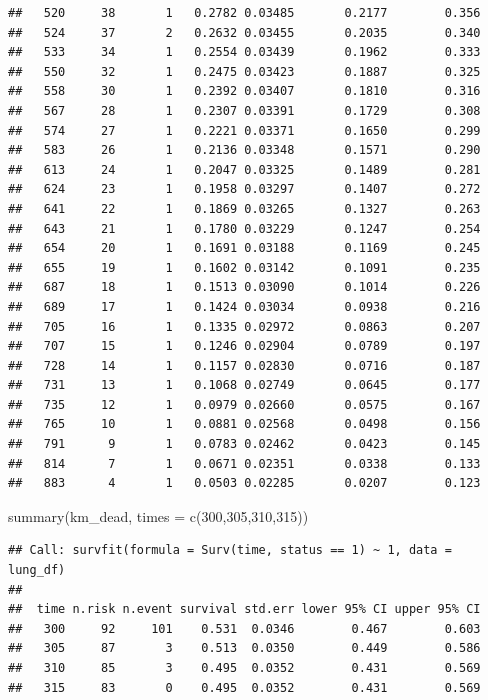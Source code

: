 \documentclass[
]{article}
\newenvironment{Shaded}{\begin{snugshade}}{\end{snugshade}}
\newcommand{\AttributeTok}[1]{\textcolor[rgb]{0.77,0.63,0.00}{#1}}
\newcommand{\DecValTok}[1]{\textcolor[rgb]{0.00,0.00,0.81}{#1}}
\newcommand{\FunctionTok}[1]{\textcolor[rgb]{0.00,0.00,0.00}{#1}}
\newcommand{\NormalTok}[1]{#1}
\begin{document}
\begin{verbatim}
##   520     38       1   0.2782 0.03485       0.2177        0.356
##   524     37       2   0.2632 0.03455       0.2035        0.340
##   533     34       1   0.2554 0.03439       0.1962        0.333
##   550     32       1   0.2475 0.03423       0.1887        0.325
##   558     30       1   0.2392 0.03407       0.1810        0.316
##   567     28       1   0.2307 0.03391       0.1729        0.308
##   574     27       1   0.2221 0.03371       0.1650        0.299
##   583     26       1   0.2136 0.03348       0.1571        0.290
##   613     24       1   0.2047 0.03325       0.1489        0.281
##   624     23       1   0.1958 0.03297       0.1407        0.272
##   641     22       1   0.1869 0.03265       0.1327        0.263
##   643     21       1   0.1780 0.03229       0.1247        0.254
##   654     20       1   0.1691 0.03188       0.1169        0.245
##   655     19       1   0.1602 0.03142       0.1091        0.235
##   687     18       1   0.1513 0.03090       0.1014        0.226
##   689     17       1   0.1424 0.03034       0.0938        0.216
##   705     16       1   0.1335 0.02972       0.0863        0.207
##   707     15       1   0.1246 0.02904       0.0789        0.197
##   728     14       1   0.1157 0.02830       0.0716        0.187
##   731     13       1   0.1068 0.02749       0.0645        0.177
##   735     12       1   0.0979 0.02660       0.0575        0.167
##   765     10       1   0.0881 0.02568       0.0498        0.156
##   791      9       1   0.0783 0.02462       0.0423        0.145
##   814      7       1   0.0671 0.02351       0.0338        0.133
##   883      4       1   0.0503 0.02285       0.0207        0.123
\end{verbatim}

\begin{Shaded}
\begin{Highlighting}[]
\FunctionTok{summary}\NormalTok{(km\_dead, }\AttributeTok{times =} \FunctionTok{c}\NormalTok{(}\DecValTok{300}\NormalTok{,}\DecValTok{305}\NormalTok{,}\DecValTok{310}\NormalTok{,}\DecValTok{315}\NormalTok{))}
\end{Highlighting}
\end{Shaded}

\begin{verbatim}
## Call: survfit(formula = Surv(time, status == 1) ~ 1, data = lung_df)
## 
##  time n.risk n.event survival std.err lower 95% CI upper 95% CI
##   300     92     101    0.531  0.0346        0.467        0.603
##   305     87       3    0.513  0.0350        0.449        0.586
##   310     85       3    0.495  0.0352        0.431        0.569
##   315     83       0    0.495  0.0352        0.431        0.569
\end{verbatim}
\end{document}
